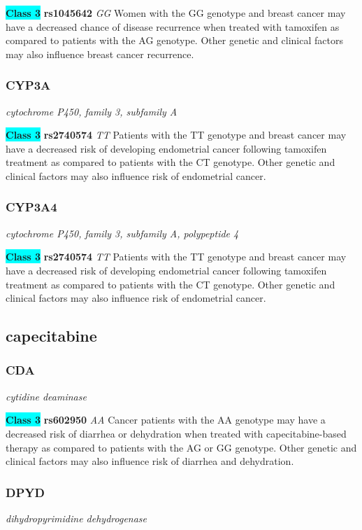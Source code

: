 \documentclass{report}
\begin{document}
\textbf{\colorbox{cyan} {Class 3}} \textbf{ rs1045642 } \textit{ GG }
Women with the GG genotype and breast cancer may have a decreased chance of disease recurrence when treated with tamoxifen as compared to patients with the AG genotype. Other genetic and clinical factors may also influence breast cancer recurrence.\newline\subsubsection{ CYP3A }
\textit{ cytochrome P450, family 3, subfamily A }

\textbf{\colorbox{cyan} {Class 3}} \textbf{ rs2740574 } \textit{ TT }
Patients with the TT genotype and breast cancer may have a decreased risk of developing endometrial cancer following tamoxifen treatment as compared to patients with the CT genotype. Other genetic and clinical factors may also influence risk of endometrial cancer.\newline\subsubsection{ CYP3A4 }
\textit{ cytochrome P450, family 3, subfamily A, polypeptide 4 }

\textbf{\colorbox{cyan} {Class 3}} \textbf{ rs2740574 } \textit{ TT }
Patients with the TT genotype and breast cancer may have a decreased risk of developing endometrial cancer following tamoxifen treatment as compared to patients with the CT genotype. Other genetic and clinical factors may also influence risk of endometrial cancer.\newline\subsection{ capecitabine }\subsubsection{ CDA }
\textit{ cytidine deaminase }

\textbf{\colorbox{cyan} {Class 3}} \textbf{ rs602950 } \textit{ AA }
Cancer patients with the AA genotype may have a decreased risk of diarrhea or dehydration when treated with capecitabine-based therapy as compared to patients with the AG or GG genotype. Other genetic and clinical factors may also influence risk of diarrhea and dehydration.\newline\subsubsection{ DPYD }
\textit{ dihydropyrimidine dehydrogenase }
\end{document}
